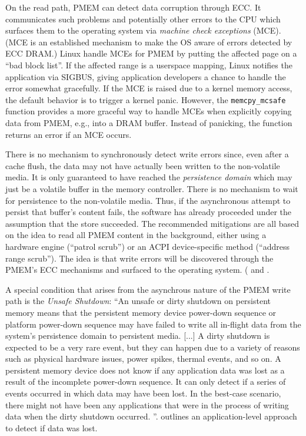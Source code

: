 \documentclass[12pt,a4paper,twoside]{book}
\begin{document}
\begin{description}
        On the read path, PMEM can detect data corruption through ECC.
        It communicates such problems and potentially other errors to the CPU which surfaces them to the operating system via \textit{machine check exceptions} (MCE).
        (MCE is an established mechanism to make the OS aware of errors detected by ECC DRAM.)
        Linux handle MCEs for PMEM by putting the affected page on a ``bad block list''.
        If the affected range is a userspace mapping, Linux notifies the application via SIGBUS, giving application developers a chance to handle the error somewhat gracefully.
        If the MCE is raised due to a kernel memory access, the default behavior is to trigger a kernel panic.
        However, the \lstinline{memcpy_mcsafe} function provides a more graceful way to handle MCEs when explicitly copying data from PMEM, e.g., into a DRAM buffer.
        Instead of panicking, the function returns an error if an MCE occurs.~\cite{ReliabilityAvailabilityServiceability,PersistentmemoryErrorHandling,Scargall2020,xuNOVAFortisFaulttolerantNonvolatile2017}

        There is no mechanism to synchronously detect write errors since, even after a cache flush, the data may not have actually been written to the non-volatile media.
        It is only guaranteed to have reached the \textit{persistence domain} which may just be a volatile buffer in the memory controller.
        There is no mechanism to wait for persistence to the non-volatile media.
        Thus, if the asynchronous attempt to persist that buffer's content fails, the software has already proceeded under the assumption that the store succeeded.
        The recommended mitigations are all based on the idea to read all PMEM content in the background, either using a hardware engine (``patrol scrub'') or an ACPI device-specific method (``address range scrub'').
        The idea is that write errors will be discovered through the PMEM's ECC mechanisms and surfaced to the operating system.
        (\cite{ReliabilityAvailabilityServiceability} and \cite[Chapter 17]{Scargall2020}.

        A special condition that arises from the asynchrous nature of the PMEM write path is the \textit{Unsafe Shutdown}:
        ``An unsafe or dirty shutdown on persistent memory means that the persistent memory
        device power-down sequence or platform power-down sequence may have failed
        to write all in-flight data from the system’s persistence domain to persistent media.
        [...] A dirty shutdown is expected to be a very
        rare event, but they can happen due to a variety of reasons such as physical hardware
        issues, power spikes, thermal events, and so on.
        A persistent memory device does not know if any application data was lost as a result
        of the incomplete power-down sequence. It can only detect if a series of events occurred
        in which data may have been lost. In the best-case scenario, there might not have been
        any applications that were in the process of writing data when the dirty shutdown
        occurred.
        ''\cite[Chapter 17]{Scargall2020}.
        \citeauthor{Scargall2020} outlines an application-level approach to detect if data was lost.


\end{description}
\end{document}
